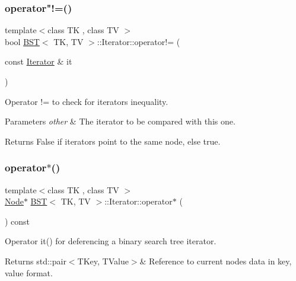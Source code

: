 \subsubsection{\texorpdfstring{operator"!=()}{operator!=()}}
{\footnotesize\ttfamily template$<$class TK , class TV $>$ \\
bool \hyperlink{classBST}{B\+ST}$<$ TK, TV $>$\+::Iterator\+::operator!= (\begin{DoxyParamCaption}\item[{const \hyperlink{classBST_1_1Iterator}{Iterator} \&}]{it }\end{DoxyParamCaption})\hspace{0.3cm}{\ttfamily [inline]}}



Operator != to check for iterators inequality. 


\begin{DoxyParams}{Parameters}
{\em other} & The iterator to be compared with this one. \\
\hline
\end{DoxyParams}
\begin{DoxyReturn}{Returns}
False if iterators point to the same node, else true. 
\end{DoxyReturn}
\mbox{\label{classBST_1_1Iterator_a50c96d5ed9de2db03796635e62b74ca8}} 
\subsubsection{\texorpdfstring{operator$\ast$()}{operator*()}}
{\footnotesize\ttfamily template$<$class TK , class TV $>$ \\
\hyperlink{structBST_1_1Node}{Node}$\ast$ \hyperlink{classBST}{B\+ST}$<$ TK, TV $>$\+::Iterator\+::operator$\ast$ (\begin{DoxyParamCaption}{ }\end{DoxyParamCaption}) const\hspace{0.3cm}{\ttfamily [inline]}}



Operator it() for deferencing a binary search tree iterator. 

\begin{DoxyReturn}{Returns}
std\+::pair$<$\+T\+Key, T\+Value$>$\& Reference to current node\textquotesingle{}s data in key, value format. 
\end{DoxyReturn}
\mbox{\label{classBST_1_1Iterator_a65087decb04c6d422a115bbec0be1f2c}} 
